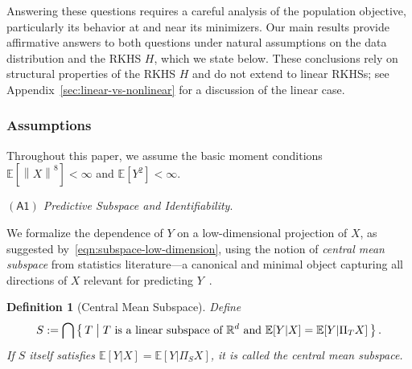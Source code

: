 \documentclass[sn-mathphys-num]{sn-jnl}%
\numberwithin{equation}{section}
\newcommand{\R}{\mathbb{R}}
\newcommand{\E}{\mathbb{E}}
\newcommand{\norm}[1]{\left\|{#1}\right\|} %
\theoremstyle{thmstyleone}%
\theoremstyle{thmstyletwo}%
\theoremstyle{thmstylethree}%
\newtheorem{definition}{Definition}%
\begin{document}
\vspace{.5em} 
Answering these questions requires a careful analysis of the population objective, particularly its 
behavior at and near its minimizers. 
Our main results provide affirmative answers to both questions under natural assumptions on the data 
distribution and the RKHS $H$, which we state below. 
These conclusions rely on structural properties of the RKHS $H$ and do not extend to linear RKHSs; see Appendix~\ref{sec:linear-vs-nonlinear} for a discussion of the linear case.






\subsubsection{Assumptions} 
\indent\indent 
Throughout this paper, we assume the basic moment conditions
$\E[\norm{X}^8] < \infty$ and $\E[Y^2] < \infty.$ 

\vspace{.5em} 
\noindent\noindent 
\emph{$\mathsf{(A1)}$ Predictive Subspace and Identifiability}. \vspace{.3em} 

We formalize the 
dependence of $Y$ on a low-dimensional projection of $X$, as
suggested by~\eqref{eqn:subspace-low-dimension}, using the notion of 
\emph{central mean subspace} from statistics literature---a canonical and minimal object 
capturing all directions of $X$ relevant for predicting $Y$~\cite[Definition 2]{CookLi02}.


\vspace{.5em}

\begin{definition}[Central Mean Subspace]
\label{definition:central-mean-subspace}
Define \vspace{-.5em}
\[
S := \bigcap \left\{\, T \;\middle|\; 
T \text{ is a linear subspace of $\R^d$ and } \E[Y | X] = \E[Y | \Pi_T X] \,\right\}. \vspace{-.5em}
\]
If $S$ itself satisfies $\E[Y|X] = \E[Y|\Pi_S X]$, it is called the central mean subspace.
\end{definition}
\end{document}
